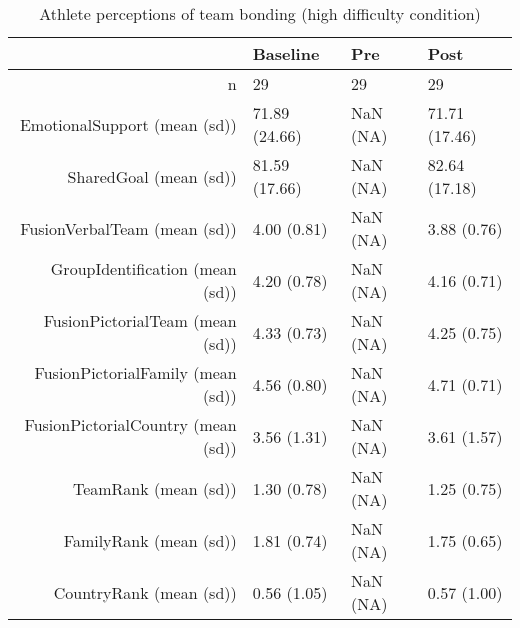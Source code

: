 \begin{table}[ht]
\centering
\begin{tabular}{rlll}
  \hline
 & Baseline & Pre & Post \\ 
  \hline
n &    29 &  29 &    29 \\ 
  EmotionalSupport (mean (sd)) & 71.89 (24.66) & NaN (NA) & 71.71 (17.46) \\ 
  SharedGoal (mean (sd)) & 81.59 (17.66) & NaN (NA) & 82.64 (17.18) \\ 
  FusionVerbalTeam (mean (sd)) &  4.00 (0.81) & NaN (NA) &  3.88 (0.76) \\ 
  GroupIdentification (mean (sd)) &  4.20 (0.78) & NaN (NA) &  4.16 (0.71) \\ 
  FusionPictorialTeam (mean (sd)) &  4.33 (0.73) & NaN (NA) &  4.25 (0.75) \\ 
  FusionPictorialFamily (mean (sd)) &  4.56 (0.80) & NaN (NA) &  4.71 (0.71) \\ 
  FusionPictorialCountry (mean (sd)) &  3.56 (1.31) & NaN (NA) &  3.61 (1.57) \\ 
  TeamRank (mean (sd)) &  1.30 (0.78) & NaN (NA) &  1.25 (0.75) \\ 
  FamilyRank (mean (sd)) &  1.81 (0.74) & NaN (NA) &  1.75 (0.65) \\ 
  CountryRank (mean (sd)) &  0.56 (1.05) & NaN (NA) &  0.57 (1.00) \\ 
   \hline
\end{tabular}
\caption{Athlete perceptions of 
 team bonding (high difficulty condition)} 
\end{table}
